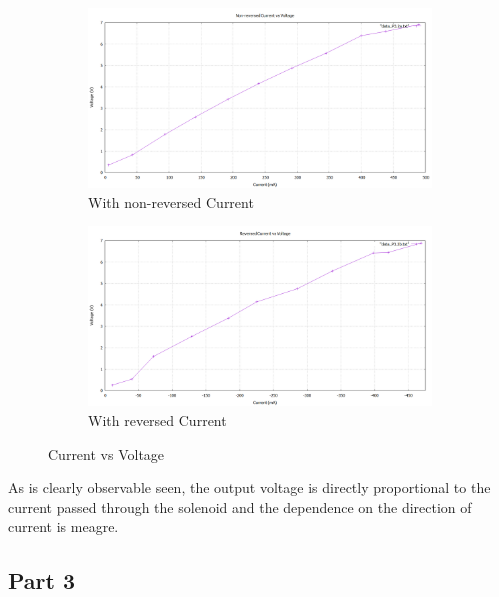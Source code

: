 \documentclass[12pt]{article}
\begin{document}
\begin{figure}[H]
	\begin{subfigure}[b]{0.5\linewidth}
		\centering
		\includegraphics[width = 0.85\linewidth, trim = {0 0 0 0}, clip]{Part_2_Irreversed_Current_vs_Voltage.png}
		\caption{With non-reversed Current}
	\end{subfigure}
	\begin{subfigure}[b]{0.5\linewidth}
		\centering
		\includegraphics[width = 0.85\linewidth, trim = {0 0 0 0}, clip]{Part_2_Reversed_Current_vs_Voltage.png}
		\caption{With reversed Current}
	\end{subfigure}
		\caption{Current vs Voltage}
\end{figure}

As is clearly observable seen, the output voltage is directly proportional to the current passed through the solenoid and the dependence on the direction of current is meagre.

\subsection{Part 3}
\end{document}
